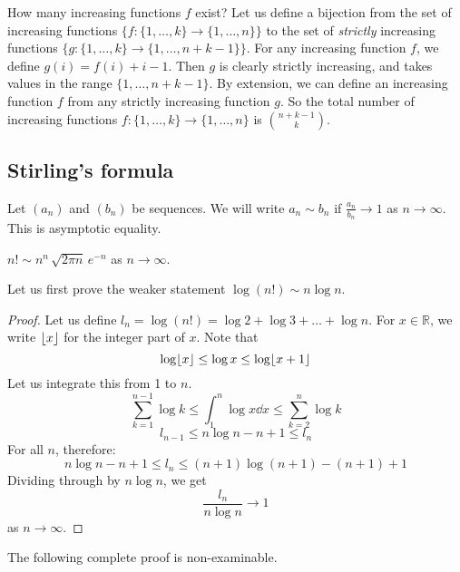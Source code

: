 How many increasing functions \(f\) exist?
Let us define a bijection from the set of increasing functions \(\{f\colon \{1, \dots, k\} \to \{1, \dots, n\}\}\) to the set of \textit{strictly} increasing functions \(\{g\colon \{1, \dots, k\} \to \{1, \dots, n+k-1\}\}\).
For any increasing function \(f\), we define \(g(i) = f(i) + i - 1\).
Then \(g\) is clearly strictly increasing, and takes values in the range \(\{1, \dots, n+k-1\}\).
By extension, we can define an increasing function \(f\) from any strictly increasing function \(g\).
So the total number of increasing functions \(f\colon \{1, \dots, k\} \to \{1, \dots, n\}\) is \(\binom{n+k-1}{k}\).

\subsection{Stirling's formula}
Let \((a_n)\) and \((b_n)\) be sequences.
We will write \(a_n \sim b_n\) if \(\frac{a_n}{b_n} \to 1\) as \(n \to \infty\).
This is asymptotic equality.
\begin{theorem}
	\(n!
	\sim n^n\, \sqrt{2 \pi n}\, e^{-n}\) as \(n \to \infty\).
\end{theorem}
\noindent Let us first prove the weaker statement \(\log (n!) \sim n \log n\).
\begin{proof}
	Let us define \(l_n = \log (n!) = \log 2 + \log 3 + \dots + \log n\).
	For \(x \in \mathbb R\), we write \(\lfloor x\rfloor\) for the integer part of \(x\).
	Note that
	\[
		\log \lfloor x\rfloor \leq \log x \leq \log \lfloor x+1\rfloor
	\]
	Let us integrate this from 1 to \(n\).
	\[
		\sum_{k=1}^{n-1} \log k \leq \int_1^n \log x\dd{x} \leq \sum_{k=2}^{n} \log k
	\]
	\[
		l_{n-1} \leq n \log n - n + 1 \leq l_n
	\]
	For all \(n\), therefore:
	\[
		n \log n - n + 1 \leq l_n \leq (n+1) \log (n+1) - (n+1) + 1
	\]
	Dividing through by \(n\log n\), we get
	\[
		\frac{l_n}{n \log n} \to 1
	\]
	as \(n \to \infty\).
\end{proof}
\noindent The following complete proof is non-examinable.
